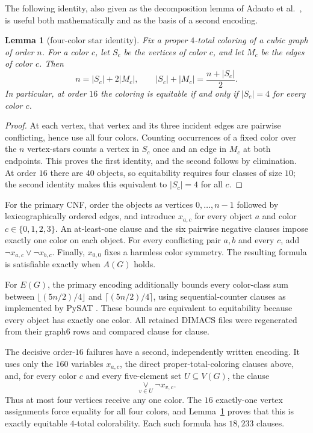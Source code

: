 \documentclass[11pt]{article}
\newtheorem{lemma}[theorem]{Lemma}
\begin{document}
The following identity, also given as the decomposition lemma of
Adauto et al.\ \cite{AdautoEtAl2026}, is useful both mathematically and as
the basis of a second encoding.

\begin{lemma}[four-color star identity]\label{lem:star}
Fix a proper \(4\)-total coloring of a cubic graph of order \(n\).  For a
color \(c\), let \(S_c\) be the vertices of color \(c\), and let \(M_c\)
be the edges of color \(c\).  Then
\[
  n=|S_c|+2|M_c|,
  \qquad
  |S_c|+|M_c|=\frac{n+|S_c|}{2}.
\]
In particular, at order \(16\) the coloring is equitable if and only if
\(|S_c|=4\) for every color \(c\).
\end{lemma}

\begin{proof}
At each vertex, that vertex and its three incident edges are pairwise
conflicting, hence use all four colors.  Counting occurrences of a fixed
color over the \(n\) vertex-stars counts a vertex in \(S_c\) once and an
edge in \(M_c\) at both endpoints.  This proves the first identity, and
the second follows by elimination.  At order \(16\) there are \(40\)
objects, so equitability requires four classes of size \(10\); the second
identity makes this equivalent to \(|S_c|=4\) for all \(c\).
\end{proof}

For the primary CNF, order the objects as vertices \(0,\ldots,n-1\)
followed by lexicographically ordered edges, and introduce \(x_{a,c}\)
for every object \(a\) and color \(c\in\{0,1,2,3\}\).  An at-least-one
clause and the six pairwise negative clauses impose exactly one color on
each object.  For every conflicting pair \(a,b\) and every \(c\), add
  \(\lnot x_{a,c}\lor\lnot x_{b,c}\).  Finally, \(x_{0,0}\) fixes a harmless
color symmetry.  The resulting formula is satisfiable exactly when
\(A(G)\) holds.

For \(E(G)\), the primary encoding additionally bounds every color-class
sum between \(\lfloor(5n/2)/4\rfloor\) and
\(\lceil(5n/2)/4\rceil\), using sequential-counter clauses
\cite{Sinz2005} as implemented by PySAT \cite{IgnatievEtAl2018}.  These
bounds are equivalent to equitability because every object has exactly
one color.  All retained DIMACS files were regenerated from their graph6
rows and compared clause for clause.

The decisive order-\(16\) failures have a second, independently written
encoding.  It uses only the \(160\) variables \(x_{a,c}\), the direct
proper-total-coloring clauses above, and, for every color \(c\) and every
five-element set \(U\subseteq V(G)\), the clause
\[
  \mathop{\vee}\limits_{v\in U}\lnot x_{v,c}.
\]
Thus at most four vertices receive any one color.  The \(16\) exactly-one
vertex assignments force equality for all four colors, and
Lemma~\ref{lem:star} proves that this is exactly equitable
\(4\)-total colorability.  Each such formula has \(18{,}233\) clauses.
\end{document}

